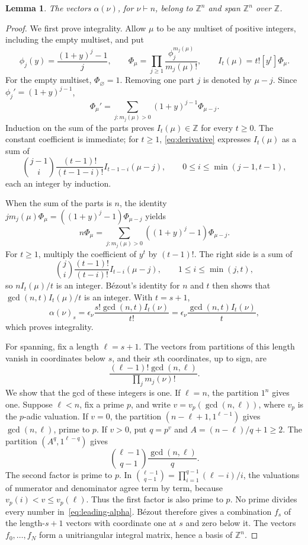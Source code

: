 \documentclass[11pt]{article}
\newtheorem{lemma}[theorem]{Lemma}
\theoremstyle{remark}
\newcommand{\Z}{\mathbb{Z}}
\begin{document}
\begin{lemma}\label{lem:A}
The vectors $\alpha(\nu)$, for $\nu\vdash n$, belong to $\Z^n$ and
span $\Z^n$ over $\Z$.
\end{lemma}
\begin{proof}
We first prove integrality. Allow $\mu$ to be any multiset of positive
integers, including the empty multiset, and put
\[
 \phi_j(y)=\frac{(1+y)^j-1}{j},\qquad
 \Phi_\mu=\prod_{j\geq1}\frac{\phi_j^{m_j(\mu)}}{m_j(\mu)!},
 \qquad I_t(\mu)=t![y^t]\Phi_\mu.
\]
For the empty multiset, $\Phi_\varnothing=1$. Removing one part $j$
is denoted by $\mu-j$. Since $\phi_j'=(1+y)^{j-1}$,
\begin{equation}\label{eq:derivative}
 \Phi_\mu'=\sum_{j:m_j(\mu)>0}(1+y)^{j-1}\Phi_{\mu-j}.
\end{equation}
Induction on the sum of the parts proves $I_t(\mu)\in\Z$ for every
$t\geq0$. The constant coefficient is immediate; for $t\geq1$,
\eqref{eq:derivative} expresses $I_t(\mu)$ as a sum of
\[
 \binom{j-1}{i}\frac{(t-1)!}{(t-1-i)!}I_{t-1-i}(\mu-j),
 \qquad 0\leq i\leq\min(j-1,t-1),
\]
each an integer by induction.

When the sum of the parts is $n$, the identity
$j m_j(\mu)\Phi_\mu=((1+y)^j-1)\Phi_{\mu-j}$ yields
\begin{equation}\label{eq:euler}
 n\Phi_\mu=\sum_{j:m_j(\mu)>0}((1+y)^j-1)\Phi_{\mu-j}.
\end{equation}
For $t\geq1$, multiply the coefficient of $y^t$ by $(t-1)!$.
The right side is a sum of
\[
 \binom ji\frac{(t-1)!}{(t-i)!}I_{t-i}(\mu-j),
 \qquad 1\leq i\leq\min(j,t),
\]
so $nI_t(\mu)/t$ is an integer. B\'ezout's identity for $n$ and $t$
then shows that $\gcd(n,t)I_t(\mu)/t$ is an integer. With $t=s+1$,
\[
 \alpha(\nu)_s=\epsilon_\nu\frac{s!\gcd(n,t)I_t(\nu)}{t!}
 =\epsilon_\nu\frac{\gcd(n,t)I_t(\nu)}{t},
\]
which proves integrality.

For spanning, fix a length $\ell=s+1$. The vectors from partitions
of this length vanish in coordinates below $s$, and their $s$th
coordinates, up to sign, are
\begin{equation}\label{eq:leading-alpha}
 \frac{(\ell-1)!\gcd(n,\ell)}{\prod_j m_j(\nu)!}.
\end{equation}
We show that the gcd of these integers is one. If $\ell=n$, the partition
$1^n$ gives one. Suppose $\ell<n$, fix a prime $p$, and write
$v=v_p(\gcd(n,\ell))$, where $v_p$ is the $p$-adic valuation. If $v=0$, the partition
$(n-\ell+1,1^{\ell-1})$ gives $\gcd(n,\ell)$, prime to $p$.
If $v>0$, put $q=p^v$ and $A=(n-\ell)/q+1\geq2$. The partition
$(A^q,1^{\ell-q})$ gives
\[
 \binom{\ell-1}{q-1}\frac{\gcd(n,\ell)}q.
\]
The second factor is prime to $p$. In
$\binom{\ell-1}{q-1}=\prod_{i=1}^{q-1}(\ell-i)/i$,
the valuations of numerator and denominator agree term by term, because
$v_p(i)<v\leq v_p(\ell)$. Thus the first factor is also prime to $p$.
No prime divides every number in~\eqref{eq:leading-alpha}.
B\'ezout therefore gives a combination $f_s$ of the length-$s+1$
vectors with coordinate one at $s$ and zero below it. The vectors
$f_0,\ldots,f_N$ form a unitriangular integral matrix, hence a basis
of $\Z^n$.
\end{proof}
\end{document}
